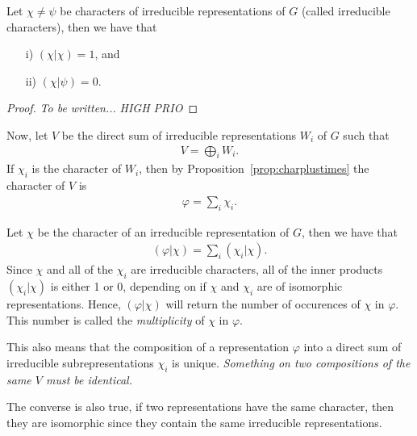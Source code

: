 \begin{theorem}\label{thm:irredcrit}
	Let $\chi \neq \psi$ be characters of irreducible representations of $G$ (called irreducible characters), then we have that 
	\begin{enumerate}
		\item[i)] $(\chi|\chi)= 1$, and
		\item[ii)] $(\chi|\psi) = 0$.
	\end{enumerate}
\end{theorem}
\begin{proof}
	\textit{To be written...} \textit{HIGH PRIO}
\end{proof}

Now, let $V$ be the direct sum of irreducible representations $W_i$ of $G$ such that
\begin{align*}
	V = \bigoplus_i W_i.
\end{align*}
If $\chi_i$ is the character of $W_i$, then by Proposition~\ref{prop:charplustimes} the character of $V$ is
\begin{align*}
	\varphi = \sum_i \chi_i.
\end{align*}

Let $\chi$ be the character of an irreducible representation of $G$, then we have that
\begin{align*}
	(\varphi|\chi) = \sum_i (\chi_i|\chi).
\end{align*}
Since $\chi$ and all of the $\chi_i$ are irreducible characters, all of the inner products $(\chi_i|\chi)$ is either 1 or 0, depending on if $\chi$ and $\chi_i$ are of isomorphic representations. Hence, $(\varphi|\chi)$ will return the number of occurences of $\chi$ in $\varphi$. This number is called the \textit{multiplicity} of $\chi$ in $\varphi$.

\begin{remark}
	This also means that the composition of a representation $\varphi$ into a direct sum of irreducible subrepresentations $\chi_i$ is unique. \textit{Something on two compositions of the same $V$ must be identical.}
\end{remark}

\begin{remark}
	The converse is also true, if two representations have the same character, then they are isomorphic since they contain the same irreducible representations.
\end{remark}

